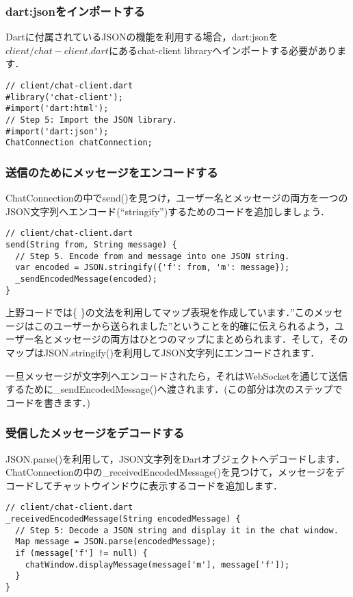 \subsubsection{dart:jsonをインポートする}

Dartに付属されているJSONの機能を利用する場合，dart:jsonを$ client/chat-client.dart $にあるchat-client libraryへインポートする必要があります．

\begin{verbatim}
// client/chat-client.dart
#library('chat-client');
#import('dart:html');
// Step 5: Import the JSON library.
#import('dart:json');
ChatConnection chatConnection;
\end{verbatim}

\subsubsection{送信のためにメッセージをエンコードする}

ChatConnectionの中でsend()を見つけ，ユーザー名とメッセージの両方を一つのJSON文字列へエンコード(``stringify'')するためのコードを追加しましょう．

\begin{verbatim}
// client/chat-client.dart
send(String from, String message) {
  // Step 5. Encode from and message into one JSON string.
  var encoded = JSON.stringify({'f': from, 'm': message});
  _sendEncodedMessage(encoded);
}
\end{verbatim}

上野コードでは\{ \}の文法を利用してマップ表現を作成しています．''このメッセージはこのユーザーから送られました''ということを的確に伝えられるよう，ユーザー名とメッセージの両方はひとつのマップにまとめられます．そして，そのマップはJSON.stringify()を利用してJSON文字列にエンコードされます．

一旦メッセージが文字列へエンコードされたら，それはWebSocketを通じて送信するために\_sendEncodedMessage()へ渡されます．(この部分は次のステップでコードを書きます．)

\subsubsection{受信したメッセージをデコードする}

JSON.parse()を利用して，JSON文字列をDartオブジェクトへデコードします．ChatConnectionの中の\_receivedEncodedMessage()を見つけて，メッセージをデコードしてチャットウインドウに表示するコードを追加します．

\begin{verbatim}
// client/chat-client.dart
_receivedEncodedMessage(String encodedMessage) {
  // Step 5: Decode a JSON string and display it in the chat window.
  Map message = JSON.parse(encodedMessage);
  if (message['f'] != null) {
    chatWindow.displayMessage(message['m'], message['f']);
  }
}
\end{verbatim}

